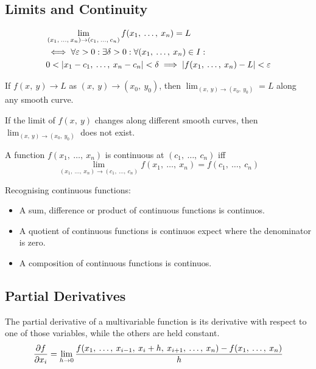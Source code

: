 \documentclass{article}
\begin{document}
\subsection{Limits and Continuity}
\begin{definition}
    \begin{align*}
		&\lim_{(x_1,\: \ldots,\: x_n)\to (c_1,\: \ldots,\: c_n)} f(x_1,\: \ldots,\: x_n) = L \\
        &\iff\forall\varepsilon>0: \exists\delta>0: \forall (x_1,\: \ldots,\: x_n) \in I: \\
        &0<\abs{x_1-c_1,\: \ldots,\: x_n-c_n}<\delta \implies \abs{f(x_1,\: \ldots,\: x_n)-L}<\varepsilon
	\end{align*}
\end{definition}
\begin{theorem}
    If $f(x,\: y) \to L$ as $(x,\: y) \to (x_0,\: y_0)$, then $\displaystyle \lim_{(x,\: y) \to (x_0,\: y_0)} = L$ along any smooth curve.
\end{theorem}
\begin{theorem}
    If the limit of $f(x,\: y)$ changes along different smooth curves, then $\displaystyle \lim_{(x,\: y) \to (x_0,\: y_0)}$ does not exist.
\end{theorem}
\begin{theorem}
    A function $f(x_1,\: \ldots,\: x_n)$ is continuous at $(c_1,\: \ldots,\: c_n)$ iff
    \begin{equation*}
        \lim_{(x_1,\: \ldots,\: x_n)\to (c_1,\: \ldots,\: c_n)} f(x_1,\: \ldots,\: x_n) = f(c_1,\: \ldots,\: c_n)
    \end{equation*}
\end{theorem}
Recognising continuous functions:
\begin{itemize}
    \item A sum, difference or product of continuous functions is continuos.
    \item A quotient of continuous functions is continuos expect where the denominator is zero.
    \item A composition of continuous functions is continuos.
\end{itemize}
\subsection{Partial Derivatives}
\begin{definition}
    The partial derivative of a multivariable function is its derivative with respect to one of those variables, while the others are held constant.
    \begin{equation*}
        \pdv{f}{x_i} = \lim_{h \to 0} \frac{f(x_1,\: \ldots,\: x_{i-1},\: x_i+h,\: x_{i+1},\: \ldots,\: x_n) - f(x_1,\: \ldots,\: x_n)}{h}
    \end{equation*}
\end{definition}
\end{document}
